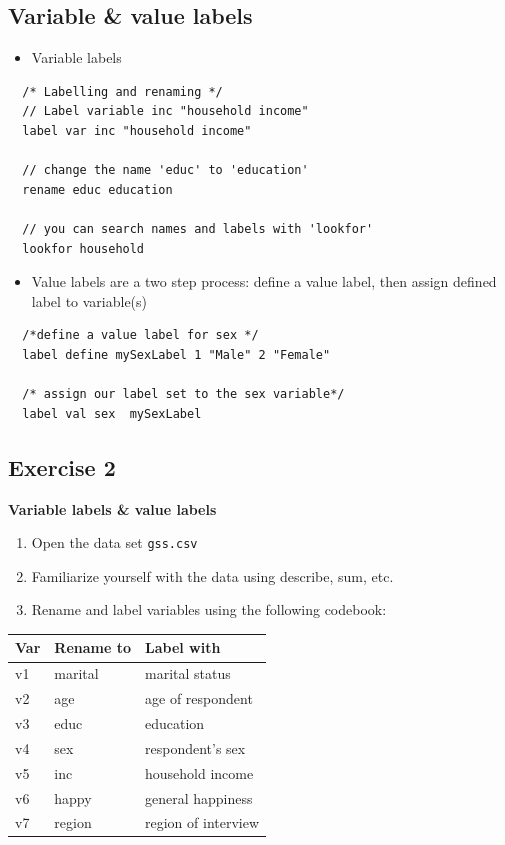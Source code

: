 \documentclass[]{book}
\providecommand{\tightlist}{%
  \setlength{\itemsep}{0pt}\setlength{\parskip}{0pt}}
\begin{document}
\subsection{Variable \& value labels}\label{variable-value-labels}

\begin{itemize}
\tightlist
\item
  Variable labels
\end{itemize}

\begin{verbatim}
  /* Labelling and renaming */
  // Label variable inc "household income"
  label var inc "household income"

  // change the name 'educ' to 'education'
  rename educ education

  // you can search names and labels with 'lookfor' 
  lookfor household
\end{verbatim}

\begin{itemize}
\tightlist
\item
  Value labels are a two step process: define a value label, then assign
  defined label to variable(s)
\end{itemize}

\begin{verbatim}
  /*define a value label for sex */
  label define mySexLabel 1 "Male" 2 "Female"

  /* assign our label set to the sex variable*/
  label val sex  mySexLabel
\end{verbatim}

\subsection{Exercise 2}\label{exercise-2-4}

\textbf{Variable labels \& value labels}

\begin{enumerate}
\def\labelenumi{\arabic{enumi}.}
\tightlist
\item
  Open the data set \texttt{gss.csv}
\item
  Familiarize yourself with the data using describe, sum, etc.
\item
  Rename and label variables using the following codebook:
\end{enumerate}

\begin{longtable}[]{@{}lll@{}}
\toprule
Var & Rename to & Label with\tabularnewline
\midrule
\endhead
v1 & marital & marital status\tabularnewline
v2 & age & age of respondent\tabularnewline
v3 & educ & education\tabularnewline
v4 & sex & respondent's sex\tabularnewline
v5 & inc & household income\tabularnewline
v6 & happy & general happiness\tabularnewline
v7 & region & region of interview\tabularnewline
\bottomrule
\end{longtable}
\end{document}
